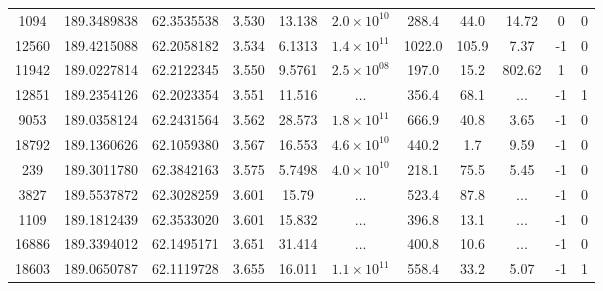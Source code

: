 \begin{table}
\begin{tabular}{ccccccccccc}
       1094 &                  189.3489838 &                 62.3535538 &          3.530 &           13.138 & $2.0\times10^{10}$ &          288.4 &        44.0 &       14.72 &                0 &                  0 \\
      12560 &                  189.4215088 &                 62.2058182 &          3.534 &           6.1313 & $1.4\times10^{11}$ &         1022.0 &       105.9 &        7.37 &               -1 &                  0 \\
      11942 &                  189.0227814 &                 62.2122345 &          3.550 &           9.5761 & $2.5\times10^{08}$ &          197.0 &        15.2 &      802.62 &                1 &                  0 \\
      12851 &                  189.2354126 &                 62.2023354 &          3.551 &           11.516 &                ... &          356.4 &        68.1 &         ... &               -1 &                  1 \\
       9053 &                  189.0358124 &                 62.2431564 &          3.562 &           28.573 & $1.8\times10^{11}$ &          666.9 &        40.8 &        3.65 &               -1 &                  0 \\
      18792 &                  189.1360626 &                 62.1059380 &          3.567 &           16.553 & $4.6\times10^{10}$ &          440.2 &         1.7 &        9.59 &               -1 &                  0 \\
        239 &                  189.3011780 &                 62.3842163 &          3.575 &           5.7498 & $4.0\times10^{10}$ &          218.1 &        75.5 &        5.45 &               -1 &                  0 \\
       3827 &                  189.5537872 &                 62.3028259 &          3.601 &            15.79 &                ... &          523.4 &        87.8 &         ... &               -1 &                  0 \\
       1109 &                  189.1812439 &                 62.3533020 &          3.601 &           15.832 &                ... &          396.8 &        13.1 &         ... &               -1 &                  0 \\
      16886 &                  189.3394012 &                 62.1495171 &          3.651 &           31.414 &                ... &          400.8 &        10.6 &         ... &               -1 &                  0 \\
      18603 &                  189.0650787 &                 62.1119728 &          3.655 &           16.011 & $1.1\times10^{11}$ &          558.4 &        33.2 &        5.07 &               -1 &                  1 \\

\end{tabular}
\end{table}
